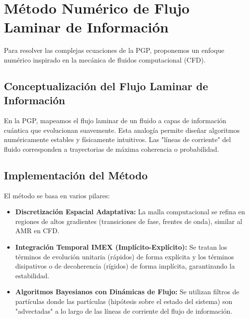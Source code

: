 \documentclass{book} %
\begin{document}
\chapter{Método Numérico de Flujo Laminar de Información}
Para resolver las complejas ecuaciones de la PGP, proponemos un enfoque numérico inspirado en la mecánica de fluidos computacional (CFD).

\section{Conceptualización del Flujo Laminar de Información}
En la PGP, mapeamos el flujo laminar de un fluido a capas de información cuántica que evolucionan suavemente. Esta analogía permite diseñar algoritmos numéricamente estables y físicamente intuitivos. Las "líneas de corriente" del fluido corresponden a trayectorias de máxima coherencia o probabilidad.

\section{Implementación del Método}
El método se basa en varios pilares:
\begin{itemize}
    \item \textbf{Discretización Espacial Adaptativa:} La malla computacional se refina en regiones de altos gradientes (transiciones de fase, frentes de onda), similar al AMR en CFD.
    \item \textbf{Integración Temporal IMEX (Implícito-Explícito):} Se tratan los términos de evolución unitaria (rápidos) de forma explícita y los términos disipativos o de decoherencia (rígidos) de forma implícita, garantizando la estabilidad.
    \item \textbf{Algoritmos Bayesianos con Dinámicas de Flujo:} Se utilizan filtros de partículas donde las partículas (hipótesis sobre el estado del sistema) son "advectadas" a lo largo de las líneas de corriente del flujo de información.
\end{itemize}
\end{document}
